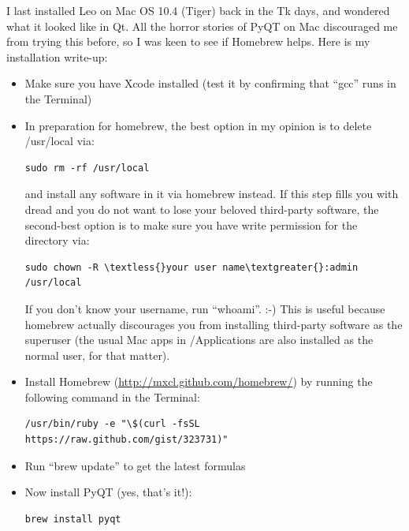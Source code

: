 \documentclass[a4paper,10pt,english]{sphinxmanual}
\begin{document}
I last installed Leo on Mac OS 10.4 (Tiger) back in the Tk days, and
wondered what it looked like in Qt. All the horror stories of PyQT on Mac
discouraged me from trying this before, so I was keen to see if Homebrew
helps. Here is my installation write-up:
\begin{itemize}
\item {} 
Make sure you have Xcode installed (test it by confirming that ``gcc'' runs
in the Terminal)

\item {} 
In preparation for homebrew, the best option in my opinion is to delete
/usr/local via:

\begin{Verbatim}[commandchars=\\\{\}]
sudo rm -rf /usr/local
\end{Verbatim}

and install any software in it via homebrew instead. If this step fills
you with dread and you do not want to lose your beloved third-party
software, the second-best option is to make sure you have write
permission for the directory via:

\begin{Verbatim}[commandchars=\\\{\}]
sudo chown -R \textless{}your user name\textgreater{}:admin /usr/local
\end{Verbatim}

If you don't know your username, run ``whoami''. :-) This is useful because
homebrew actually discourages you from installing third-party software as
the superuser (the usual Mac apps in /Applications are also installed as
the normal user, for that matter).

\item {} 
Install Homebrew (\href{http://mxcl.github.com/homebrew/}{http://mxcl.github.com/homebrew/}) by running the
following command in the Terminal:

\begin{Verbatim}[commandchars=\\\{\}]
/usr/bin/ruby -e "\$(curl -fsSL https://raw.github.com/gist/323731)"
\end{Verbatim}

\item {} 
Run ``brew update'' to get the latest formulas

\item {} 
Now install PyQT (yes, that's it!):

\begin{Verbatim}[commandchars=\\\{\}]
brew install pyqt
\end{Verbatim}


\end{itemize}
\end{document}
